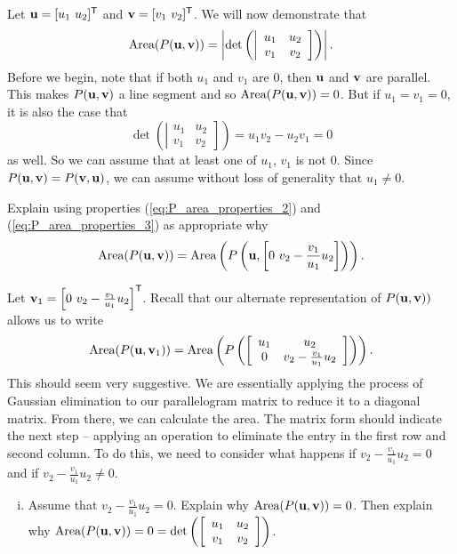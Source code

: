\begin{pactivity} \label{act:det_area} Let $\mathbf{u} = [u_1 \ u_2]^{\mathsf{T}}$ and $\mathbf{v} = [v_1 \ v_2]^{\mathsf{T}}$. We will now demonstrate that 
\[\text{Area}(P(\mathbf{u},\mathbf{v})) = \left|\det\left(\left| \begin{array}{cc} u_1&u_2\\v_1&v_2 \end{array} \right] \right)\right|.\]
Before we begin, note that if both $u_1$ and $v_1$ are $0$, then $\mathbf{u}$ and $\mathbf{v}$ are parallel. This makes $P(\mathbf{u}, \mathbf{v})$ a line segment and so $\text{Area}(P(\mathbf{u},\mathbf{v})) = 0$. But if $u_1 = v_1 = 0$, it is also the case that 
\[\det\left(\left| \begin{array}{cc} u_1&u_2\\v_1&v_2 \end{array} \right] \right) = u_1v_2-u_2v_1 = 0\]
as well. So we can assume that at least one of $u_1$, $v_1$ is not $0$. Since $P(\mathbf{u}, \mathbf{v}) = P(\mathbf{v}, \mathbf{u})$, we can assume without loss of generality that $u_1 \neq 0$. 

\ba
\item Explain using properties (\ref{eq:P_area_properties_2}) and  (\ref{eq:P_area_properties_3}) as appropriate why
\[\text{Area}(P(\mathbf{u},\mathbf{v})) =\text{Area}\left(P\left(\mathbf{u}, \left[0 \ v_2-\frac{v_1}{u_1}u_2\right] \right) \right).\]

\item Let $\vv_1 = \left[0 \ v_2-\frac{v_1}{u_1}u_2\right]^{\tr}$. Recall that our alternate representation of $P(\mathbf{u},\mathbf{v}))$ allows us to write
\[\text{Area}(P(\mathbf{u}, \mathbf{v}_1)) = \text{Area}\left( P\left(  \left[ \begin{array}{cc} u_1&u_2 \\ 0&v_2-\frac{v_1}{u_1}u_2 \end{array} \right] \right) \right).\]
This should seem very suggestive. We are essentially applying the process of Gaussian elimination to our parallelogram matrix to reduce it to a diagonal matrix. From there, we can calculate the area. The matrix form should indicate the next step --  applying an operation to eliminate the entry in the first row and second column. To do this, we need to consider what happens if $v_2-\frac{v_1}{u_1}u_2 = 0$ and if $v_2-\frac{v_1}{u_1}u_2 \neq 0$. 
	\begin{enumerate}[i.]
	\item Assume that $v_2-\frac{v_1}{u_1}u_2 = 0$. Explain why $\text{Area}(P(\mathbf{u},\mathbf{v})) = 0$. Then explain why $\text{Area}(P(\mathbf{u},\mathbf{v})) = 0 = \det\left(\left[ \begin{array}{cc} u_1&u_2\\v_1&v_2 \end{array} \right]\right)$. 


\end{enumerate}
\end{pactivity}
